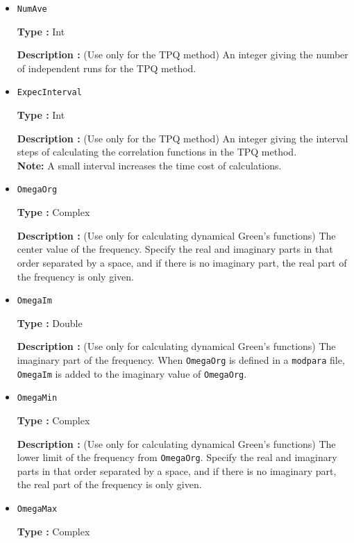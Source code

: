 \begin{itemize}
{\bf Type :} Double

{\bf Description :} (Use only for the TPQ method) An integer giving $l$ of $l-\hat{H}/N_{s}$ used in the TPQ method.
 
\item \verb|NumAve|

{\bf Type :} Int

{\bf Description :} (Use only for the TPQ method) An integer giving the number of independent runs for the TPQ method. 

\item \verb|ExpecInterval|

{\bf Type :} Int

{\bf Description :} (Use only for the TPQ method) An integer giving the interval steps of calculating the correlation functions in the TPQ method.\\ 
{\bf Note:} A small interval increases the time cost of calculations.
 
 \item \verb|OmegaOrg|

{\bf Type :} Complex

{\bf Description :} {(Use only for calculating dynamical Green's functions) 
The center value of the frequency. 
Specify the real and imaginary parts in that order separated by a space, 
and if there is no imaginary part, the real part of the frequency is only given.}

\item \verb|OmegaIm|

    {\bf Type :} Double
    
    {\bf Description :} (Use only for calculating dynamical Green's functions) 
    The imaginary part of the frequency. 
    When \verb|OmegaOrg| is defined in a \verb|modpara| file, \verb|OmegaIm| is added to the imaginary value of \verb|OmegaOrg|.

\item \verb|OmegaMin|

    {\bf Type :} Complex
    
    {\bf Description :} (Use only for calculating dynamical Green's functions) 
    The lower limit of the frequency from \verb|OmegaOrg|. 
    Specify the real and imaginary parts in that order separated by a space, and if there is no imaginary part, the real part of the frequency is only given.
    
  \item \verb|OmegaMax|

    {\bf Type :} Complex
    

\end{itemize}
